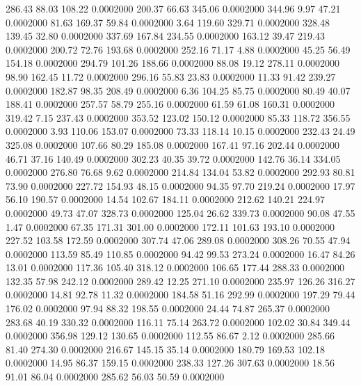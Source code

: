  286.43   88.03  108.22   0.0002000
 200.37   66.63  345.06   0.0002000
 344.96    9.97   47.21   0.0002000
  81.63  169.37   59.84   0.0002000
   3.64  119.60  329.71   0.0002000
 328.48  139.45   32.80   0.0002000
 337.69  167.84  234.55   0.0002000
 163.12   39.47  219.43   0.0002000
 200.72   72.76  193.68   0.0002000
 252.16   71.17    4.88   0.0002000
  45.25   56.49  154.18   0.0002000
 294.79  101.26  188.66   0.0002000
  88.08   19.12  278.11   0.0002000
  98.90  162.45   11.72   0.0002000
 296.16   55.83   23.83   0.0002000
  11.33   91.42  239.27   0.0002000
 182.87   98.35  208.49   0.0002000
   6.36  104.25   85.75   0.0002000
  80.49   40.07  188.41   0.0002000
 257.57   58.79  255.16   0.0002000
  61.59   61.08  160.31   0.0002000
 319.42    7.15  237.43   0.0002000
 353.52  123.02  150.12   0.0002000
  85.33  118.72  356.55   0.0002000
   3.93  110.06  153.07   0.0002000
  73.33  118.14   10.15   0.0002000
 232.43   24.49  325.08   0.0002000
 107.66   80.29  185.08   0.0002000
 167.41   97.16  202.44   0.0002000
  46.71   37.16  140.49   0.0002000
 302.23   40.35   39.72   0.0002000
 142.76   36.14  334.05   0.0002000
 276.80   76.68    9.62   0.0002000
 214.84  134.04   53.82   0.0002000
 292.93   80.81   73.90   0.0002000
 227.72  154.93   48.15   0.0002000
  94.35   97.70  219.24   0.0002000
  17.97   56.10  190.57   0.0002000
  14.54  102.67  184.11   0.0002000
 212.62  140.21  224.97   0.0002000
  49.73   47.07  328.73   0.0002000
 125.04   26.62  339.73   0.0002000
  90.08   47.55    1.47   0.0002000
  67.35  171.31  301.00   0.0002000
 172.11  101.63  193.10   0.0002000
 227.52  103.58  172.59   0.0002000
 307.74   47.06  289.08   0.0002000
 308.26   70.55   47.94   0.0002000
 113.59   85.49  110.85   0.0002000
  94.42   99.53  273.24   0.0002000
  16.47   84.26   13.01   0.0002000
 117.36  105.40  318.12   0.0002000
 106.65  177.44  288.33   0.0002000
 132.35   57.98  242.12   0.0002000
 289.42   12.25  271.10   0.0002000
 235.97  126.26  316.27   0.0002000
  14.81   92.78   11.32   0.0002000
 184.58   51.16  292.99   0.0002000
 197.29   79.44  176.02   0.0002000
  97.94   88.32  198.55   0.0002000
  24.44   74.87  265.37   0.0002000
 283.68   40.19  330.32   0.0002000
 116.11   75.14  263.72   0.0002000
 102.02   30.84  349.44   0.0002000
 356.98  129.12  130.65   0.0002000
 112.55   86.67    2.12   0.0002000
 285.66   81.40  274.30   0.0002000
 216.67  145.15   35.14   0.0002000
 180.79  169.53  102.18   0.0002000
  14.95   86.37  159.15   0.0002000
 238.33  127.26  307.63   0.0002000
  18.56   91.01   86.04   0.0002000
 285.62   56.03   50.59   0.0002000
